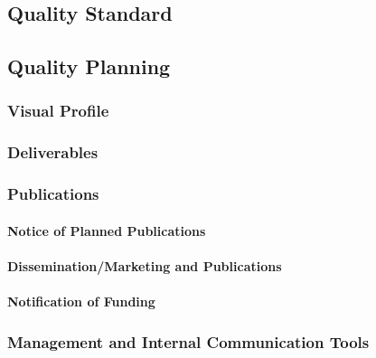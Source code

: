 \documentclass[
  11pt,
]{article}
\begin{document}
\hypertarget{quality-standard}{%
\subsection{Quality Standard}\label{quality-standard}}

\hypertarget{quality-planning-1}{%
\subsection{Quality Planning}\label{quality-planning-1}}

\hypertarget{visual-profile}{%
\subsubsection{Visual Profile}\label{visual-profile}}

\hypertarget{deliverables}{%
\subsubsection{Deliverables}\label{deliverables}}

\hypertarget{publications}{%
\subsubsection{Publications}\label{publications}}

\hypertarget{notice-of-planned-publications}{%
\paragraph{Notice of Planned
Publications}\label{notice-of-planned-publications}}

\hypertarget{disseminationmarketing-and-publications}{%
\paragraph{Dissemination/Marketing and
Publications}\label{disseminationmarketing-and-publications}}

\hypertarget{notification-of-funding}{%
\paragraph{Notification of Funding}\label{notification-of-funding}}

\hypertarget{management-and-internal-communication-tools}{%
\subsubsection{Management and Internal Communication
Tools}\label{management-and-internal-communication-tools}}
\end{document}
